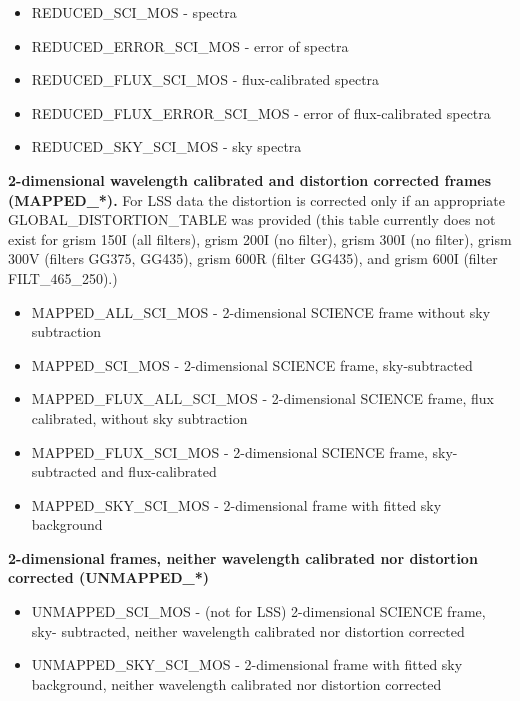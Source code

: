\begin{itemize}

\item REDUCED\_SCI\_MOS - spectra
\item REDUCED\_ERROR\_SCI\_MOS - error of spectra
\item REDUCED\_FLUX\_SCI\_MOS - flux-calibrated spectra
\item REDUCED\_FLUX\_ERROR\_SCI\_MOS - error of flux-calibrated spectra
\item REDUCED\_SKY\_SCI\_MOS - sky spectra

\end{itemize}

{\bf 2-dimensional wavelength calibrated and distortion corrected frames (MAPPED\_*).}
For LSS data the distortion is corrected only if an appropriate GLOBAL\_DISTORTION\_TABLE was provided (this table currently does not exist for grism 150I (all filters), grism 200I (no filter), grism 300I (no filter), grism 300V (filters GG375, GG435), grism 600R (filter GG435), and grism 600I (filter FILT\_465\_250).)

\begin{itemize}
\item MAPPED\_ALL\_SCI\_MOS - 2-dimensional SCIENCE frame without sky subtraction
\item MAPPED\_SCI\_MOS - 2-dimensional SCIENCE frame, sky-subtracted
\item MAPPED\_FLUX\_ALL\_SCI\_MOS - 2-dimensional SCIENCE frame, flux calibrated, without sky subtraction
\item MAPPED\_FLUX\_SCI\_MOS - 2-dimensional SCIENCE frame, sky-subtracted
and flux-calibrated
\item MAPPED\_SKY\_SCI\_MOS - 2-dimensional frame with fitted sky background
\end{itemize}

{\bf 2-dimensional frames, neither wavelength calibrated nor distortion corrected (UNMAPPED\_*)}

\begin{itemize}

\item UNMAPPED\_SCI\_MOS - (not for LSS) 2-dimensional SCIENCE frame, sky-
subtracted, neither wavelength calibrated nor distortion corrected
\item UNMAPPED\_SKY\_SCI\_MOS - 2-dimensional frame with fitted sky background, neither wavelength calibrated nor distortion corrected
\end{itemize}

